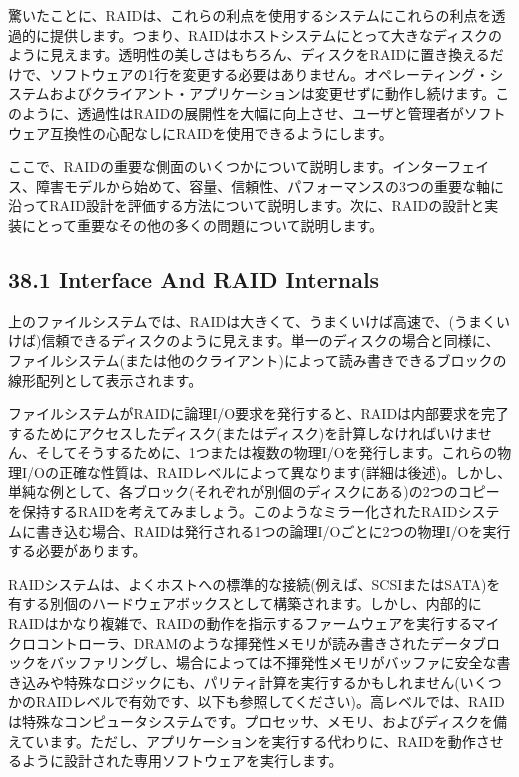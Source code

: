 驚いたことに、RAIDは、これらの利点を使用するシステムにこれらの利点を透過的に提供します。つまり、RAIDはホストシステムにとって大きなディスクのように見えます。透明性の美しさはもちろん、ディスクをRAIDに置き換えるだけで、ソフトウェアの1行を変更する必要はありません。オペレーティング・システムおよびクライアント・アプリケーションは変更せずに動作し続けます。このように、透過性はRAIDの展開性を大幅に向上させ、ユーザと管理者がソフトウェア互換性の心配なしにRAIDを使用できるようにします。

ここで、RAIDの重要な側面のいくつかについて説明します。インターフェイス、障害モデルから始めて、容量、信頼性、パフォーマンスの3つの重要な軸に沿ってRAID設計を評価する方法について説明します。次に、RAIDの設計と実装にとって重要なその他の多くの問題について説明します。

\hypertarget{interface-and-raid-internals}{%
\subsection*{38.1 Interface And RAID
Internals}\label{interface-and-raid-internals}}

上のファイルシステムでは、RAIDは大きくて、うまくいけば高速で、(うまくいけば)信頼できるディスクのように見えます。単一のディスクの場合と同様に、ファイルシステム(または他のクライアント)によって読み書きできるブロックの線形配列として表示されます。

ファイルシステムがRAIDに論理I/O要求を発行すると、RAIDは内部要求を完了するためにアクセスしたディスク(またはディスク)を計算しなければいけません、そしてそうするために、1つまたは複数の物理I/Oを発行します。これらの物理I/Oの正確な性質は、RAIDレベルによって異なります(詳細は後述)。しかし、単純な例として、各ブロック(それぞれが別個のディスクにある)の2つのコピーを保持するRAIDを考えてみましょう。このようなミラー化されたRAIDシステムに書き込む場合、RAIDは発行される1つの論理I/Oごとに2つの物理I/Oを実行する必要があります。

RAIDシステムは、よくホストへの標準的な接続(例えば、SCSIまたはSATA)を有する別個のハードウェアボックスとして構築されます。しかし、内部的にRAIDはかなり複雑で、RAIDの動作を指示するファームウェアを実行するマイクロコントローラ、DRAMのような揮発性メモリが読み書きされたデータブロックをバッファリングし、場合によっては不揮発性メモリがバッファに安全な書き込みや特殊なロジックにも、パリティ計算を実行するかもしれません(いくつかのRAIDレベルで有効です、以下も参照してください)。高レベルでは、RAIDは特殊なコンピュータシステムです。プロセッサ、メモリ、およびディスクを備えています。ただし、アプリケーションを実行する代わりに、RAIDを動作させるように設計された専用ソフトウェアを実行します。

